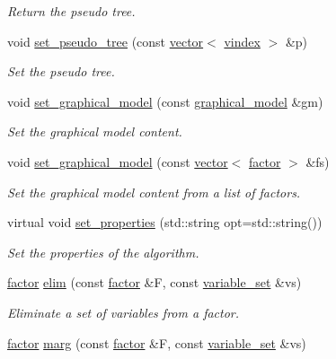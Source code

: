 \begin{DoxyCompactItemize}
\begin{DoxyCompactList}\small\item\em Return the pseudo tree. \end{DoxyCompactList}\item 
void \hyperlink{classmerlin_1_1ijgp_af01fb5f7e1803fe61e84576ee10c5ca0}{set\+\_\+pseudo\+\_\+tree} (const \hyperlink{classmerlin_1_1vector}{vector}$<$ \hyperlink{classmerlin_1_1ijgp_a4c3416087411a776f76a630217515d94}{vindex} $>$ \&p)
\begin{DoxyCompactList}\small\item\em Set the pseudo tree. \end{DoxyCompactList}\item 
void \hyperlink{classmerlin_1_1ijgp_ae8cc52c3df108d284f464af1918a5b5c}{set\+\_\+graphical\+\_\+model} (const \hyperlink{classmerlin_1_1graphical__model}{graphical\+\_\+model} \&gm)
\begin{DoxyCompactList}\small\item\em Set the graphical model content. \end{DoxyCompactList}\item 
void \hyperlink{classmerlin_1_1ijgp_a6d4dff7d912568950b1bd1b09a406f11}{set\+\_\+graphical\+\_\+model} (const \hyperlink{classmerlin_1_1vector}{vector}$<$ \hyperlink{classmerlin_1_1factor}{factor} $>$ \&fs)
\begin{DoxyCompactList}\small\item\em Set the graphical model content from a list of factors. \end{DoxyCompactList}\item 
virtual void \hyperlink{classmerlin_1_1ijgp_aa092a9e81e288cd2b27b6fc1bb19c1c5}{set\+\_\+properties} (std\+::string opt=std\+::string())
\begin{DoxyCompactList}\small\item\em Set the properties of the algorithm. \end{DoxyCompactList}\item 
\hyperlink{classmerlin_1_1factor}{factor} \hyperlink{classmerlin_1_1ijgp_a7c0bce25459696e44183c6eb6c16c935}{elim} (const \hyperlink{classmerlin_1_1factor}{factor} \&F, const \hyperlink{classmerlin_1_1variable__set}{variable\+\_\+set} \&vs)
\begin{DoxyCompactList}\small\item\em Eliminate a set of variables from a factor. \end{DoxyCompactList}\item 
\hyperlink{classmerlin_1_1factor}{factor} \hyperlink{classmerlin_1_1ijgp_a565027b696c3e8471ad8b8c9e2ce8711}{marg} (const \hyperlink{classmerlin_1_1factor}{factor} \&F, const \hyperlink{classmerlin_1_1variable__set}{variable\+\_\+set} \&vs)

\end{DoxyCompactItemize}
